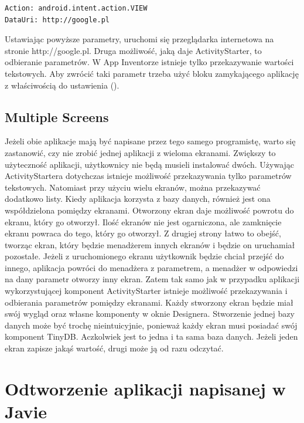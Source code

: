 \begin{lstlisting}
Action: android.intent.action.VIEW
DataUri: http://google.pl
\end{lstlisting}

Ustawiając powyższe parametry, uruchomi się przeglądarka internetowa na stronie http://google.pl. Druga możliwość, jaką daje ActivityStarter, to odbieranie parametrów. W App Inventorze istnieje tylko przekazywanie wartości tekstowych. Aby zwrócić taki parametr trzeba użyć bloku zamykającego aplikację z właściwością do ustawienia ().

\subsection{Multiple Screens}

Jeżeli obie aplikacje mają być napisane przez tego samego programistę, warto się zastanowić, czy nie zrobić jednej aplikacji z wieloma ekranami. Zwiększy to użyteczność aplikacji, użytkownicy nie będą musieli instalować dwóch. Używając ActivityStartera dotychczas istnieje możliwość przekazywania tylko parametrów tekstowych. Natomiast przy użyciu wielu ekranów, można przekazywać dodatkowo listy. Kiedy aplikacja korzysta z bazy danych, również jest ona współdzielona pomiędzy ekranami. Otworzony ekran daje możliwość powrotu do ekranu, który go otworzył. Ilość ekranów nie jest ogarniczona, ale zamknięcie ekranu powraca do tego, który go otworzył. Z drugiej strony łatwo to obejść, tworząc ekran, który będzie menadżerem innych ekranów i będzie on uruchamiał pozostałe. Jeżeli z uruchomionego ekranu użytkownik będzie chciał przejść do innego, aplikacja powróci do menadżera z parametrem, a menadżer w odpowiedzi na dany parametr otworzy inny ekran. Zatem tak samo jak w przypadku aplikacji wykorzystującej komponent ActivityStarter istnieje możliwość przekazywania i odbierania parametrów pomiędzy ekranami. Każdy stworzony ekran będzie miał swój wygląd oraz własne komponenty w oknie Designera. Stworzenie jednej bazy danych może być trochę nieintuicyjnie, ponieważ każdy ekran musi posiadać swój komponent TinyDB. Aczkolwiek jest to jedna i ta sama baza danych. Jeżeli jeden ekran zapisze jakąś wartość, drugi może ją od razu odczytać.

\section{Odtworzenie aplikacji napisanej w Javie}

